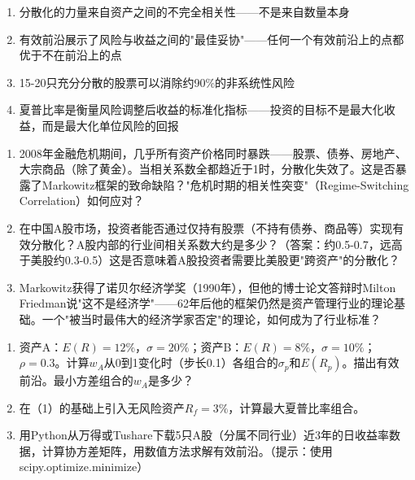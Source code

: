 \documentclass[a4paper,11pt]{ctexbook}
\begin{document}
{\begin{lessonsummary}
\begin{enumerate}
  \item 分散化的力量来自资产之间的不完全相关性——不是来自数量本身
  \item 有效前沿展示了风险与收益之间的"最佳妥协"——任何一个有效前沿上的点都优于不在前沿上的点
  \item 15-20只充分分散的股票可以消除约90\%的非系统性风险
  \item 夏普比率是衡量风险调整后收益的标准化指标——投资的目标不是最大化收益，而是最大化单位风险的回报
\end{enumerate}
\end{lessonsummary}

\begin{discuss}
\begin{enumerate}
  \item 2008年金融危机期间，几乎所有资产价格同时暴跌——股票、债券、房地产、大宗商品（除了黄金）。当相关系数全都趋近于1时，分散化失效了。这是否暴露了Markowitz框架的致命缺陷？"危机时期的相关性突变"（Regime-Switching Correlation）如何应对？
  \item 在中国A股市场，投资者能否通过仅持有股票（不持有债券、商品等）实现有效分散化？A股内部的行业间相关系数大约是多少？（答案：约0.5-0.7，远高于美股约0.3-0.5）这是否意味着A股投资者需要比美股更"跨资产"的分散化？
  \item Markowitz获得了诺贝尔经济学奖（1990年），但他的博士论文答辩时Milton Friedman说"这不是经济学"——62年后他的框架仍然是资产管理行业的理论基础。一个"被当时最伟大的经济学家否定"的理论，如何成为了行业标准？
\end{enumerate}
\end{discuss}

\begin{exercises}
\begin{enumerate}
  \item 资产A：$E(R)=12\%$，$\sigma=20\%$；资产B：$E(R)=8\%$，$\sigma=10\%$；$\rho=0.3$。计算$w_A$从0到1变化时（步长0.1）各组合的$\sigma_p$和$E(R_p)$。描出有效前沿。最小方差组合的$w_A$是多少？
  \item 在（1）的基础上引入无风险资产$R_f=3\%$，计算最大夏普比率组合。
  \item 用Python从万得或Tushare下载5只A股（分属不同行业）近3年的日收益率数据，计算协方差矩阵，用数值方法求解有效前沿。（提示：使用scipy.optimize.minimize）
\end{enumerate}
\end{exercises}

}
\end{document}
